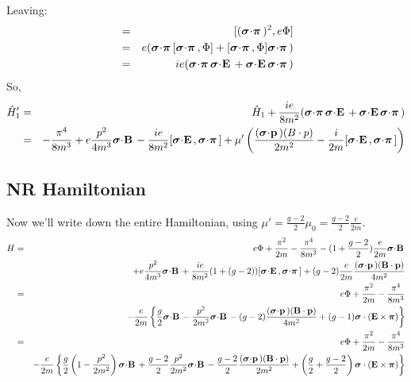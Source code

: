 Leaving:
\begin{eqnarray*}
[(\sigdotg{\pi})^2, \hat{H}_0] &=& [(\sigdotg{\pi})^2, e\Phi] \\
		&=&	e( \sigdotg{\pi}[\sigdotg{\pi},  \Phi] + [\sigdotg{\pi},  \Phi]\sigdotg{\pi}) \\
		&=&	i e( \sigdotg{\pi} \sigdot{E} + \sigdot{E} \sigdotg{\pi} ) \\
\end{eqnarray*}
So,
\begin{eqnarray*}
\hat{H}_1' 
	&=&  \hat{H}_1 + \frac{i e}{8m^2}( \sigdotg{\pi} \sigdot{E} + \sigdot{E} \sigdotg{\pi} )	\\
	&=&	 -\frac{\pi^4}{8m^3} + e \frac{p^2}{4m^3}\sigdot{B} - \frac{ie}{8m^2}[\sigdot{E},\sigdotg{\pi}]
		 + \mu' \left( \frac{ (\sigdot{p}) (B \cdot p) }{2m^2} - \frac{i}{2m}[\sigdot{E},\sigdotg{\pi}] \right)
\end{eqnarray*}



\subsection*{NR Hamiltonian}
Now we'll write down the entire Hamiltonian, using $\mu' = \frac{g-2}{2}\mu_0 = \frac{g-2}{2}\frac{e}{2m} $.
\begin{eqnarray*}
H	&=&
		e\Phi  + \frac{ \pi^2}{2m} -\frac{\pi^4}{8m^3} - (1 + \frac{g-2}{2})\frac{e}{2m} \sigdot{B}	\\
	&&
		 + e \frac{p^2}{4m^3}\sigdot{B} + \frac{ie}{8m^2}(1 + (g-2))[\sigdot{E},\sigdotg{\pi}]
		 + (g-2) \frac{e}{2m}  \frac{ (\sigdot{p}) (\v{B} \cdot \v{p}) }{4m^2}  	\\
	&=&
		e\Phi  + \frac{ \pi^2}{2m} -\frac{\pi^4}{8m^3} 
	\\&&
		- \frac{e}{2m} \left\{
			\frac{g}{2}\sigdot{B} - \frac{p^2}{2m^2}\sigdot{B}
			- (g-2) \frac{ (\sigdot{p}) (\v{B} \cdot \v{p}) }{4m^2} 
			+(g-1) \gv{\sigma} \cdot (\v{E} \times \gv{\pi})
		\right \}	\\
	&=&
		e\Phi  + \frac{ \pi^2}{2m} -\frac{\pi^4}{8m^3} 
	\\&&
		- \frac{e}{2m} \left\{
			\frac{g}{2} \left( 1 - \frac{p^2}{2m^2} \right) \sigdot{B} + \frac{g-2}{2} \frac{p^2}{2m^2}\sigdot{B}
			- \frac{g-2}{2} \frac{ (\sigdot{p}) (\v	{B} \cdot \v{p}) }{2m^2} 
			+\left(\frac{g}{2} + \frac{g-2}{2}\right) \gv{\sigma} \cdot (\v{E} \times \gv{\pi})
		\right \}	\\	
\end{eqnarray*}
 
 
 